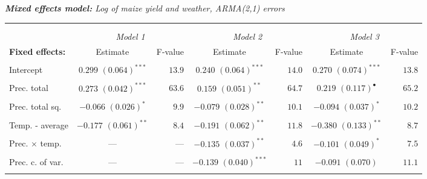 \documentclass[a4paper,12pt]{article}
\begin{document}
{\hspace{-1.5cm}
\begin{threeparttable}
\singlespacing
\caption{\textit{\textbf{Mixed  effects model:} Log of maize yield and weather, ARMA(2,1) errors}}
\label{ARMA21} 
\begin{footnotesize}

\begin{tabular}{lcrcrcr} 

\hline \vspace{-0.2cm} \\
\vspace{-0.2cm} \\
  \multicolumn{1}{l}{\vspace{0.1cm}\textbf{ }}  &\multicolumn{2}{c}{\textit{Model 1}} &\multicolumn{2}{c}{\textit{Model 2}} &\multicolumn{2}{c}{\textit{Model 3}}\\
    \multicolumn{1}{l}{\vspace{0.1cm}\textbf{Fixed effects:}}&Estimate&F-value&Estimate&F-value&Estimate&F-value\\
 \hline 
\hline
\\
\vspace{-0.2cm}Intercept&$0.299$ $(0.064)^{***}$&$13.9$&$0.240$ $(0.064)^{***}$&$14.0$&$0.270$ $(0.074)^{***}$&$13.8$\\
  \\
\vspace{-0.2cm}Prec. total&$0.273$ $(0.042)^{***}$&$63.6$&$0.159$ $(0.051)^{**}$&$64.7$&$0.219$ $(0.117)^{\bullet}$&$65.2$\\
  \\
  \vspace{-0.2cm}Prec. total sq.&$-0.066$ $(0.026)^{*}$&$9.9$&$-0.079$ $(0.028)^{**}$&$10.1$&$-0.094$ $(0.037)^{*}$&$10.2$\\
  \\
  \vspace{-0.2cm}Temp. - average&$-0.177$ $(0.061)^{**}$&$8.4$&$-0.191$ $(0.062)^{**}$&$11.8$&$-0.380$ $(0.133)^{**}$&$8.7$\\
  \\
    \vspace{-0.2cm}Prec. $\times$ temp.&---&---&$-0.135$ $(0.037)^{**}$&$4.6$&$-0.101$ $(0.049)^{*}$&$7.5$\\
  \\
      \vspace{-0.2cm}Prec. c. of var.&---&---&$-0.139$ $(0.040)^{***}$&$11$&$-0.091$ $(0.070)^{}$&$11.1$\\
  \\

\end{tabular}
\end{footnotesize}
\end{threeparttable}}
\end{document}
